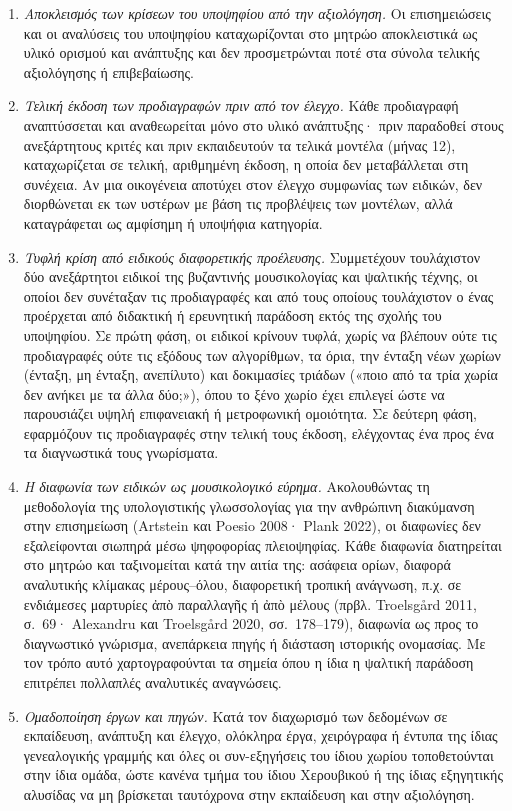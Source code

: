 \documentclass[11pt,a4paper]{article}
\begin{document}
\begin{enumerate}
\item \emph{Αποκλεισμός των κρίσεων του υποψηφίου από την αξιολόγηση.} Οι επισημειώσεις και οι αναλύσεις του υποψηφίου καταχωρίζονται στο μητρώο αποκλειστικά ως υλικό ορισμού και ανάπτυξης και δεν προσμετρώνται ποτέ στα σύνολα τελικής αξιολόγησης ή επιβεβαίωσης.
\item \emph{Τελική έκδοση των προδιαγραφών πριν από τον έλεγχο.} Κάθε προδιαγραφή αναπτύσσεται και αναθεωρείται μόνο στο υλικό ανάπτυξης· πριν παραδοθεί στους ανεξάρτητους κριτές και πριν εκπαιδευτούν τα τελικά μοντέλα (μήνας 12), καταχωρίζεται σε τελική, αριθμημένη έκδοση, η οποία δεν μεταβάλλεται στη συνέχεια. Αν μια οικογένεια αποτύχει στον έλεγχο συμφωνίας των ειδικών, δεν διορθώνεται εκ των υστέρων με βάση τις προβλέψεις των μοντέλων, αλλά καταγράφεται ως αμφίσημη ή υποψήφια κατηγορία.
\item \emph{Τυφλή κρίση από ειδικούς διαφορετικής προέλευσης.} Συμμετέχουν τουλάχιστον δύο ανεξάρτητοι ειδικοί της βυζαντινής μουσικολογίας και ψαλτικής τέχνης, οι οποίοι δεν συνέταξαν τις προδιαγραφές και από τους οποίους τουλάχιστον ο ένας προέρχεται από διδακτική ή ερευνητική παράδοση εκτός της σχολής του υποψηφίου. Σε πρώτη φάση, οι ειδικοί κρίνουν τυφλά, χωρίς να βλέπουν ούτε τις προδιαγραφές ούτε τις εξόδους των αλγορίθμων, τα όρια, την ένταξη νέων χωρίων (ένταξη, μη ένταξη, ανεπίλυτο) και δοκιμασίες τριάδων («ποιο από τα τρία χωρία δεν ανήκει με τα άλλα δύο;»), όπου το ξένο χωρίο έχει επιλεγεί ώστε να παρουσιάζει υψηλή επιφανειακή ή μετροφωνική ομοιότητα. Σε δεύτερη φάση, εφαρμόζουν τις προδιαγραφές στην τελική τους έκδοση, ελέγχοντας ένα προς ένα τα διαγνωστικά τους γνωρίσματα.
\item \emph{Η διαφωνία των ειδικών ως μουσικολογικό εύρημα.} Ακολουθώντας τη μεθοδολογία της υπολογιστικής γλωσσολογίας για την ανθρώπινη διακύμανση στην επισημείωση (Artstein και Poesio 2008· Plank 2022), οι διαφωνίες δεν εξαλείφονται σιωπηρά μέσω ψηφοφορίας πλειοψηφίας. Κάθε διαφωνία διατηρείται στο μητρώο και ταξινομείται κατά την αιτία της: ασάφεια ορίων, διαφορά αναλυτικής κλίμακας μέρους--όλου, διαφορετική τροπική ανάγνωση, π.χ. σε ενδιάμεσες μαρτυρίες ἀπὸ παραλλαγῆς ή ἀπὸ μέλους (πρβλ. Troelsgård 2011, σ.~69· Alexandru και Troelsgård 2020, σσ.~178--179), διαφωνία ως προς το διαγνωστικό γνώρισμα, ανεπάρκεια πηγής ή διάσταση ιστορικής ονομασίας. Με τον τρόπο αυτό χαρτογραφούνται τα σημεία όπου η ίδια η ψαλτική παράδοση επιτρέπει πολλαπλές αναλυτικές αναγνώσεις.
\item \emph{Ομαδοποίηση έργων και πηγών.} Κατά τον διαχωρισμό των δεδομένων σε εκπαίδευση, ανάπτυξη και έλεγχο, ολόκληρα έργα, χειρόγραφα ή έντυπα της ίδιας γενεαλογικής γραμμής και όλες οι συν-εξηγήσεις του ίδιου χωρίου τοποθετούνται στην ίδια ομάδα, ώστε κανένα τμήμα του ίδιου Χερουβικού ή της ίδιας εξηγητικής αλυσίδας να μη βρίσκεται ταυτόχρονα στην εκπαίδευση και στην αξιολόγηση.
\end{enumerate}
\end{document}
